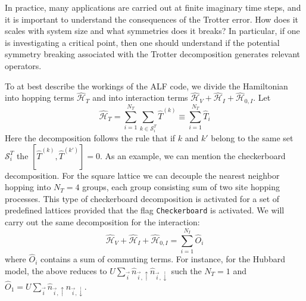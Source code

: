 In practice, many applications are carried out at finite  imaginary time steps,  and it is important to  understand the consequences of the Trotter error.   How does it scales with system size and  what  symmetries  does it  breaks?   In particular, if  one is investigating a critical  point, then one should understand  if the potential symmetry breaking  associated  with the Trotter decomposition   generates  relevant operators. 

To at best describe the workings of the ALF  code,  we divide the Hamiltonian into  hopping terms  $\hat{\mathcal{H}}_{T}$  and into interaction terms  
$\hat{\mathcal{H}}_{V} +  \hat{\mathcal{H}}_{I}   +   \hat{\mathcal{H}}_{0,I} $.       Let 
\begin{equation}
	\hat{\mathcal{H}}_{T}     = \sum_{i=1}^{N_T} \sum_{k \in \mathcal{S}^{T}_i} \hat{T}^{(k)}  \equiv \sum_{i=1}^{N_T} \hat{T}_{i} 
\end{equation}
Here the decomposition follows the rule  that if $k$ and $k'$  belong to the same set $\mathcal{S}^{T}_i $ the   $ \left[ \hat{T}^{(k)} , \hat{T}^{(k')} \right] = 0 $.  As an 
example, we can mention the checkerboard decomposition.   For the square lattice we can decouple the nearest neighbor hopping  into $N_T=4$ groups,  each group consisting  sum  of two site hopping processes.    This type of checkerboard decomposition is activated for a set  of predefined lattices provided that the flag 
\texttt{Checkerboard}   is activated.     
We will carry out the same decomposition for the interaction: 
\begin{equation}
	\hat{\mathcal{H}}_{V}  +  \hat{\mathcal{H}}_{I}   +   \hat{\mathcal{H}}_{0,I}   = \sum_{i=1}^{N_I}  \hat{O}_{i}
\end{equation}
where $\hat{O}_{i}$  contains a sum of commuting terms.  For instance, for the Hubbard model,   the  above reduces to 
$U \sum_{\vec{i}}  \hat{n}_{\vec{i},\uparrow } \hat{n}_{\vec{i},\downarrow }  $    such the $N_T = 1$ and   $ \hat{O}_{1} = U \sum_{\vec{i}}  \hat{n}_{\vec{i},\uparrow } \hat{n}_{\vec{i},\downarrow }   $. 

